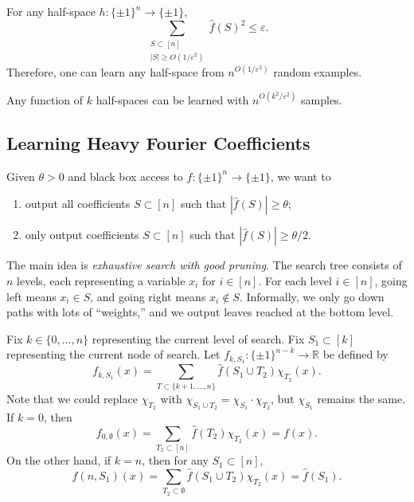 \documentclass[letterpaper, reqno,11pt]{article}
\newcommand{\RR}{\mathbb{R}}
\begin{document}
\begin{corollary}
  For any half-space $h : \{ \pm 1 \}^n \to \{ \pm 1 \}$,
  $$ \sum_{\substack{S \subset [n] \\ |S| \geq O(1/\varepsilon^2)}} \hat{f}(S)^2 \leq \varepsilon. $$
  Therefore, one can learn any half-space from $n^{O(1/\varepsilon^2)}$ random examples.
\end{corollary}

\begin{corollary}
  Any function of $k$ half-spaces can be learned with $n^{O(k^2/\varepsilon^2)}$ samples.
\end{corollary}

\subsection{Learning Heavy Fourier Coefficients}

Given $\theta > 0$ and black box access to $f : \{ \pm 1 \}^n \to \{ \pm 1 \}$, we want to
\begin{enumerate}[label=(\roman*), itemsep=0pt]
  \item output all coefficients $S \subset [n]$ such that $|\hat{f}(S)| \geq \theta$;
  \item only output coefficients $S \subset [n]$ such that $|\hat{f}(S)| \geq \theta/2$.
\end{enumerate}

The main idea is \emph{exhaustive search with good pruning}. The search tree consists of $n$ levels, each representing a variable $x_i$ for $i \in [n]$. For each level $i \in [n]$, going left means $x_i \in S$, and going right means $x_i \not \in S$. Informally, we only go down paths with lots of ``weights,'' and we output leaves reached at the bottom level.

Fix $k \in \{ 0, \ldots, n \}$ representing the current level of search. Fix $S_1 \subset [k]$ representing the current node of search. Let $f_{k, S_1} : \{ \pm 1 \}^{n - k} \to \RR$ be defined by
$$ f_{k, S_1}(x) = \sum_{T \subset \{ k + 1, \ldots, n \}} \hat{f}\left(S_1 \cup T_2\right) \chi_{T_2}(x). $$
Note that we could replace $\chi_{T_2}$ with $\chi_{S_1 \cup T_2} = \chi_{S_1} \cdot \chi_{T_2}$, but $\chi_{S_1}$ remains the same. If $k = 0$, then
$$ f_{0, \emptyset}(x) = \sum_{T_2 \subset [n]} \hat{f}\left(T_2\right) \chi_{T_2}(x) = f(x). $$
On the other hand, if $k = n$, then for any $S_1 \subset [n]$,
$$ f(n, S_1)(x) = \sum_{T_2 \subset \emptyset} \hat{f}\left(S_1 \cup T_2\right) \chi_{T_2}(x) = \hat{f}\left(S_1\right). $$
\end{document}
